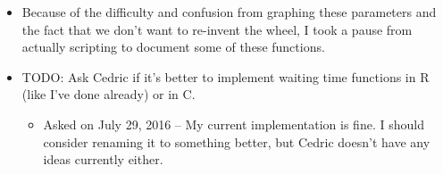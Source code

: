 \documentclass[12pt,hyperref]{labbook}
\begin{document}

\begin{itemize}
    \item Because of the difficulty and confusion from graphing these parameters and the fact that we don't want to re-invent the wheel, I took a pause from actually scripting to document some of these functions.
    \item TODO: Ask Cedric if it's better to implement waiting time functions in R (like I've done already) or in C.
    \begin{itemize}
        \item Asked on July 29, 2016 -- My current implementation is fine.
        I should consider renaming it to something better, but Cedric doesn't have any ideas currently either.
    \end{itemize}
\end{itemize}

\end{document}

